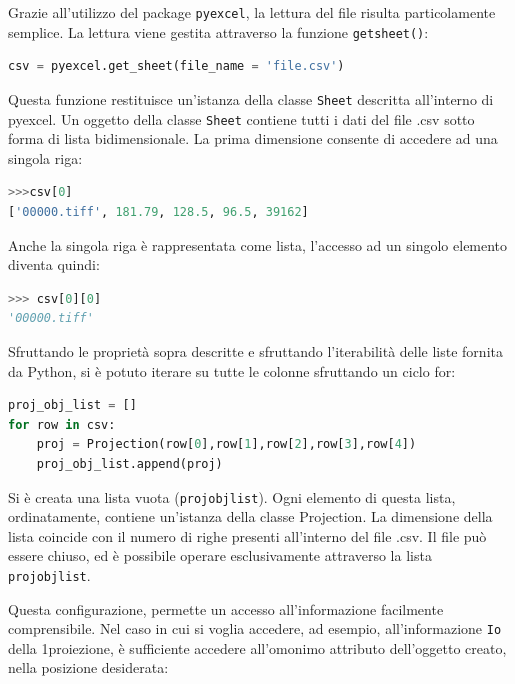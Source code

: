 \documentclass[a4paper,12pt, doubleside]{report}
\begin{document}
            Grazie all'utilizzo del package \texttt{pyexcel}, la lettura del file risulta particolamente semplice.
            La lettura viene gestita attraverso la funzione \texttt{get\textunderscore sheet()}:
            
            \begin{lstlisting}[language=python, frame=bt]
csv = pyexcel.get_sheet(file_name = 'file.csv')
            \end{lstlisting}
            
            Questa funzione restituisce un'istanza della classe \texttt{Sheet} descritta all'interno di pyexcel.
            Un oggetto della classe \texttt{Sheet} contiene tutti i dati del file .csv sotto forma di lista bidimensionale.\cite{pyexcel-docs} La prima dimensione consente di accedere ad una singola riga:
            
            \begin{lstlisting}[language=python, frame=bt]
>>>csv[0]
['00000.tiff', 181.79, 128.5, 96.5, 39162]
            \end{lstlisting}
            
            Anche la singola riga è rappresentata come lista, l'accesso ad un singolo elemento diventa quindi:
            \begin{lstlisting}[language=python, frame=bt]
>>> csv[0][0]
'00000.tiff'
            \end{lstlisting}
            
            
            Sfruttando le proprietà sopra descritte e sfruttando l'iterabilità delle liste fornita da Python\cite{python-list}, si è potuto iterare su tutte le colonne sfruttando un ciclo for:
            
            \begin{lstlisting}[language=python, frame=bt]
proj_obj_list = []
for row in csv:
    proj = Projection(row[0],row[1],row[2],row[3],row[4])
    proj_obj_list.append(proj)
            \end{lstlisting}
            
            Si è creata una lista vuota (\texttt{proj\textunderscore obj\textunderscore list}). Ogni elemento di questa lista, ordinatamente, contiene un'istanza della classe Projection. La dimensione della lista coincide con il numero di righe presenti all'interno del file .csv. Il file può essere chiuso, ed è possibile operare esclusivamente attraverso la lista \texttt{proj\textunderscore obj\textunderscore list}.
            \bigskip
            \par
            Questa configurazione, permette un accesso all'informazione facilmente comprensibile. Nel caso in cui si voglia accedere, ad esempio,  all'informazione \texttt{Io} della 1\degree proiezione, è sufficiente accedere all'omonimo attributo dell'oggetto creato, nella posizione desiderata: 
            
\end{document}

